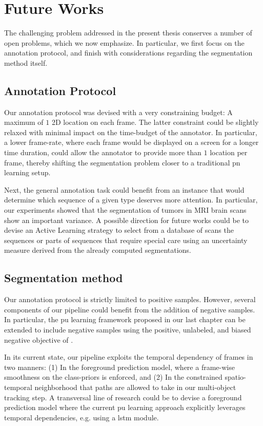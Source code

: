 \section{Future Works}

The challenging problem addressed in the present thesis conserves a number of open problems, which we now emphasize.
In particular, we first focus on the annotation protocol, and finish with considerations regarding the segmentation method itself.

\subsection{Annotation Protocol}
Our annotation protocol was devised with a very constraining budget: A maximum of $1$ 2D location on each frame.
The latter constraint could be slightly relaxed with minimal impact on the time-budget of the annotator.
In particular, a lower frame-rate, where each frame would be displayed on a screen for a longer time duration, could allow the annotator to provide more than $1$ location per frame, thereby shifting the segmentation problem closer to a traditional \gls{pn} learning setup.

Next, the general annotation task could benefit from an instance that would determine which sequence of a given type deserves more attention.
In particular, our experiments showed that the segmentation of tumors in MRI brain scans show an important variance.
A possible direction for future works could be to devise an Active Learning strategy to select from a database of scans the sequences or parts of sequences that require special care using an uncertainty measure derived from the already computed segmentations.

\subsection{Segmentation method}
Our annotation protocol is strictly limited to positive samples.
However, several components of our pipeline could benefit from the addition of negative samples.
In particular, the \gls{pu} learning framework proposed in our last chapter can be extended to include negative samples using the positive, unlabeled, and biased negative objective of \cite{hsieh19}.

In its current state, our pipeline exploits the temporal dependency of frames in two manners: (1) In the foreground prediction model, where a frame-wise smoothness on the class-priors is enforced, and (2) In the constrained spatio-temporal neighborhood that paths are allowed to take in our multi-object tracking step.
A transversal line of research could be to devise a foreground prediction model where the current \gls{pu} learning approach explicitly leverages temporal dependencies, e.g. using a \gls{lstm} module.

